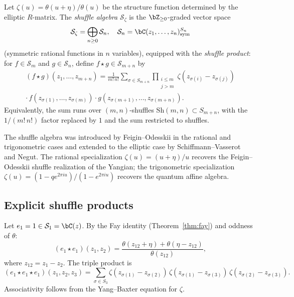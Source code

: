 \begin{definition}\label{def:shuffle-algebra}
Let $\zeta(u) = \theta(u+\eta)/\theta(u)$ be the structure function
determined by the elliptic $R$-matrix.
The \emph{shuffle algebra} $\mathcal{S}_\zeta$ is the $\bZ_{\geq 0}$-graded
vector space
\[
\mathcal{S}_\zeta = \bigoplus_{n \geq 0} \mathcal{S}_n, \quad
\mathcal{S}_n = \bC(z_1, \ldots, z_n)^{S_n}_{\mathrm{sym}}
\]
(symmetric rational functions in $n$ variables), equipped with
the \emph{shuffle product}:
for $f \in \mathcal{S}_m$ and $g \in \mathcal{S}_n$, define
$f \star g \in \mathcal{S}_{m+n}$ by
\begin{multline}\label{eq:shuffle-product}
(f \star g)(z_1, \ldots, z_{m+n})
= \frac{1}{m!\,n!} \sum_{\sigma \in S_{m+n}}
\prod_{\substack{i \leq m \\ j > m}}
\zeta(z_{\sigma(i)} - z_{\sigma(j)}) \\
\cdot\, f(z_{\sigma(1)}, \ldots, z_{\sigma(m)})
\cdot g(z_{\sigma(m+1)}, \ldots, z_{\sigma(m+n)}).
\end{multline}
Equivalently, the sum runs over $(m,n)$-shuffles
$\mathrm{Sh}(m,n) \subset S_{m+n}$, with
the $1/(m!\,n!)$ factor replaced by $1$ and the
sum restricted to shuffles.
\end{definition}

\begin{remark}[Origin]\label{rem:shuffle-origin}
The shuffle algebra was introduced by
Feigin--Odesskii in the rational and
trigonometric cases and extended to the elliptic case by
Schiffmann--Vasserot~\cite{SV13} and Negut.
The rational specialization $\zeta(u) = (u+\eta)/u$
recovers the Feigin--Odesskii shuffle realization of the
Yangian; the trigonometric specialization
$\zeta(u) = (1 - q e^{2\pi i u})/(1 - e^{2\pi i u})$
recovers the quantum affine algebra.
\end{remark}

\subsection{Explicit shuffle products}
\label{subsec:shuffle-explicit}

\begin{computation}\label{comp:shuffle-generators}
Let $e_1 = 1 \in \mathcal{S}_1 = \bC(z)$. By the Fay identity (Theorem~\ref{thm:fay}) and oddness of $\theta$:
\begin{equation}\label{eq:e1e1-result}
(e_1 \star e_1)(z_1, z_2)
= \frac{\theta(z_{12}+\eta) + \theta(\eta-z_{12})}
{\theta(z_{12})},
\end{equation}
where $z_{12} = z_1 - z_2$. The triple product is
\begin{equation}\label{eq:shuffle-e1e1e1}
(e_1 \star e_1 \star e_1)(z_1, z_2, z_3)
= \sum_{\sigma \in S_3}
\zeta(z_{\sigma(1)} - z_{\sigma(2)})\,
\zeta(z_{\sigma(1)} - z_{\sigma(3)})\,
\zeta(z_{\sigma(2)} - z_{\sigma(3)}).
\end{equation}
Associativity follows from the Yang--Baxter equation for $\zeta$.
\end{computation}

